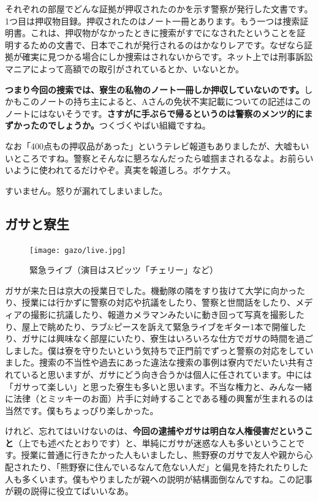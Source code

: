 それぞれの部屋でどんな証拠が押収されたのかを示す警察が発行した文書です。1つ目は押収物目録。押収されたのはノート一冊とあります。もう一つは捜索証明書。これは、押収物がなかったときに捜索がすでになされたということを証明するための文書で、日本でこれが発行されるのはかなりレアです。なぜなら証拠が確実に見つかる場合にしか捜索はされないからです。ネット上では刑事訴訟マニアによって高額での取引がされているとか、いないとか。

\textbf{つまり今回の捜索では、寮生の私物のノート一冊しか押収していないのです。}しかもこのノートの持ち主によると、Aさんの免状不実記載についての記述はこのノートにはないそうです。\textbf{さすがに手ぶらで帰るというのは警察のメンツ的にまずかったのでしょうか。}つくづくやばい組織ですね。

なお「400点もの押収品があった」というテレビ報道もありましたが、大嘘もいいところですね。警察とそんなに懇ろなんだったら嘘掴まされるなよ。お前らいいように使われてるだけやぞ。真実を報道しろ。ボケナス。

すいません。怒りが漏れてしまいました。


\subsection{ガサと寮生}

\begin{figure}
  \centering
  \texttt{[image: gazo/live.jpg]}
  \caption*{緊急ライブ（演目はスピッツ「チェリー」など）}
\end{figure}

ガサが来た日は京大の授業日でした。機動隊の隣をすり抜けて大学に向かったり、授業には行かずに警察の対応や抗議をしたり、警察と世間話をしたり、メディアの撮影に抗議したり、報道カメラマンみたいに動き回って写真を撮影したり、屋上で眺めたり、ラブ\&ピースを訴えて緊急ライブをギター1本で開催したり、ガサには興味なく部屋にいたり、寮生はいろいろな仕方でガサの時間を過ごしました。僕は寮を守りたいという気持ちで正門前でずっと警察の対応をしていました。捜索の不当性や過去にあった違法な捜索の事例は寮内でだいたい共有されていると思いますが、ガサにどう向き合うかは個人に任されています。中には「ガサって楽しい」と思った寮生も多いと思います。不当な権力と、みんな一緒に法律（とミッキーのお面）片手に対峙することである種の興奮が生まれるのは当然です。僕もちょっぴり楽しかった。




けれど、忘れてはいけないのは、\textbf{今回の逮捕やガサは明白な人権侵害だということ}（上でも述べたとおりです）と、単純にガサが迷惑な人も多いということです。授業に普通に行きたかった人もいましたし、熊野寮のガサで友人や親から心配されたり、「熊野寮に住んでいるなんて危ない人だ」と偏見を持たれたりした人も多くいます。僕もやりましたが親への説明が結構面倒なんですね。この記事が親の説得に役立てばいいなあ。


